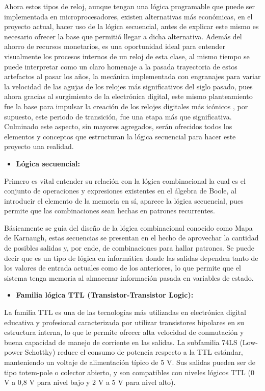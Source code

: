 \documentclass[12pt,letterpaper]{article}
\begin{document}
\indent Ahora estos tipos de reloj, aunque tengan una lógica programable que puede ser implementada en microprocesadores, existen alternativas más económicas, en el proyecto actual, hacer uso de la lógica secuencial, antes de explicar este mismo es necesario ofrecer la base que permitió llegar a dicha alternativa. Además del ahorro de recursos monetarios, es una oportunidad ideal para entender visualmente los procesos internos de un reloj de esta clase, al mismo tiempo se puede interpretar como un claro homenaje a la pasada trayectoria de estos artefactos al pasar los años, la mecánica implementada con engranajes para variar la velocidad de las agujas de los relojes más significativos del siglo pasado, pues ahora gracias al surgimiento de la electrónica digital, este mismo planteamiento fue la base para impulsar la creación de los relojes digitales más icónicos , por supuesto, este periodo de transición, fue una etapa más que significativa. Culminado este aspecto, sin mayores agregados, serán ofrecidos todos los elementos y conceptos que estructuran la lógica secuencial para hacer este proyecto una realidad.

\begin{itemize}
    \item \textbf{Lógica secuencial:}
\end{itemize}

Primero es vital entender su relación con la lógica combinacional la cual es el conjunto de operaciones y expresiones existentes en el álgebra de Boole, al introducir el elemento de la memoria en sí, aparece la lógica secuencial, pues permite que las combinaciones sean hechas en patrones recurrentes.

Básicamente se guía del diseño de la lógica combinacional conocido como Mapa de Karnaugh, estas secuencias se presentan en el hecho de aprovechar la cantidad de posibles salidas y, por ende, de combinaciones para hallar patrones. Se puede decir que es un tipo de lógica en informática donde las salidas dependen tanto de los valores de entrada actuales como de los anteriores, lo que permite que el sistema tenga memoria al almacenar información pasada en variables de estado.

\begin{itemize}
    \item \textbf{Familia lógica TTL (Transistor-Transistor Logic):}
\end{itemize}

La familia TTL es una de las tecnologías más utilizadas en electrónica digital educativa y profesional caracterizada por utilizar transistores bipolares en su estructura interna, lo que le permite ofrecer alta velocidad de conmutación y buena capacidad de manejo de corriente en las salidas. La subfamilia 74LS (Low-power Schottky) reduce el consumo de potencia respecto a la TTL estándar, manteniendo un voltaje de alimentación típico de 5 V. Sus salidas pueden ser de tipo totem-pole o colector abierto, y son compatibles con niveles lógicos TTL (0 V a 0,8 V para nivel bajo y 2 V a 5 V para nivel alto).
\end{document}
